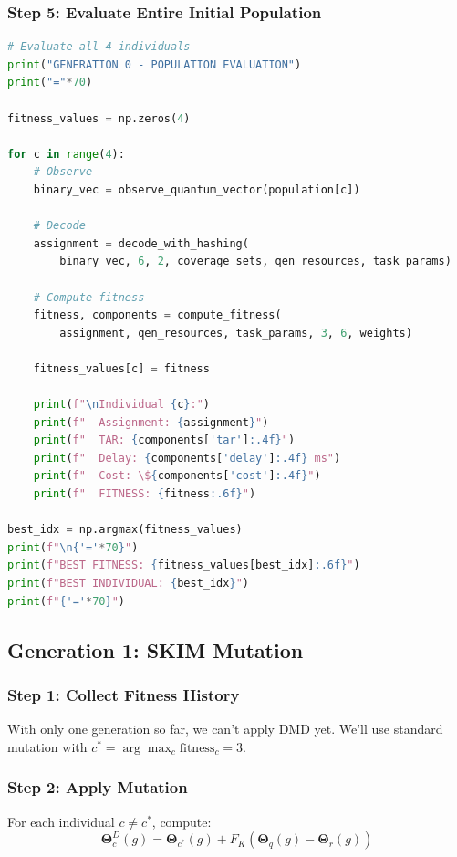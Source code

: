 \documentclass[12pt,a4paper]{article}
\begin{document}
\subsubsection{Step 5: Evaluate Entire Initial Population}

\begin{lstlisting}[language=Python, caption=Population Fitness Evaluation]
# Evaluate all 4 individuals
print("GENERATION 0 - POPULATION EVALUATION")
print("="*70)

fitness_values = np.zeros(4)

for c in range(4):
    # Observe
    binary_vec = observe_quantum_vector(population[c])
    
    # Decode
    assignment = decode_with_hashing(
        binary_vec, 6, 2, coverage_sets, qen_resources, task_params)
    
    # Compute fitness
    fitness, components = compute_fitness(
        assignment, qen_resources, task_params, 3, 6, weights)
    
    fitness_values[c] = fitness
    
    print(f"\nIndividual {c}:")
    print(f"  Assignment: {assignment}")
    print(f"  TAR: {components['tar']:.4f}")
    print(f"  Delay: {components['delay']:.4f} ms")
    print(f"  Cost: \${components['cost']:.4f}")
    print(f"  FITNESS: {fitness:.6f}")

best_idx = np.argmax(fitness_values)
print(f"\n{'='*70}")
print(f"BEST FITNESS: {fitness_values[best_idx]:.6f}")
print(f"BEST INDIVIDUAL: {best_idx}")
print(f"{'='*70}")
\end{lstlisting}

\subsection{Generation 1: SKIM Mutation}

\subsubsection{Step 1: Collect Fitness History}

With only one generation so far, we can't apply DMD yet. We'll use standard mutation with $c^* = \arg\max_c \mathrm{fitness}_c = 3$.

\subsubsection{Step 2: Apply Mutation}

For each individual $c \neq c^*$, compute:
$$\boldsymbol{\Theta}^D_c(g) = \boldsymbol{\Theta}_{c^*}(g) + F_K(\boldsymbol{\Theta}_q(g) - \boldsymbol{\Theta}_r(g))$$
\end{document}
